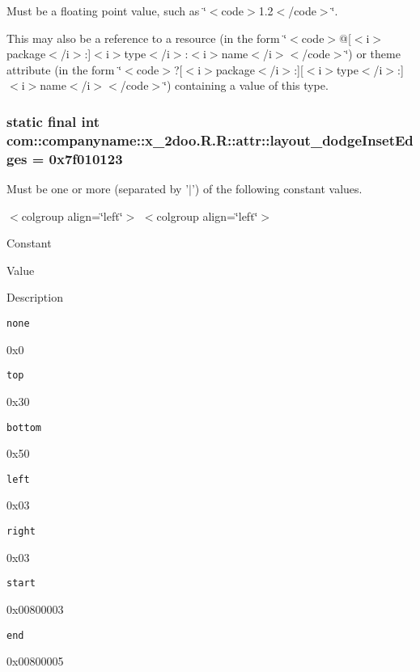 Must be a floating point value, such as \char`\"{}$<$code$>$1.2$<$/code$>$\char`\"{}. 

This may also be a reference to a resource (in the form \char`\"{}$<$code$>$@\mbox{[}$<$i$>$package$<$/i$>$:\mbox{]}$<$i$>$type$<$/i$>$:$<$i$>$name$<$/i$>$$<$/code$>$\char`\"{}) or theme attribute (in the form \char`\"{}$<$code$>$?\mbox{[}$<$i$>$package$<$/i$>$:\mbox{]}\mbox{[}$<$i$>$type$<$/i$>$:\mbox{]}$<$i$>$name$<$/i$>$$<$/code$>$\char`\"{}) containing a value of this type. \hypertarget{classcom_1_1companyname_1_1x__2doo_1_1_r_1_1attr_c809d052548073a02e91694193e09469}{
\subsubsection[{layout\_\-dodgeInsetEdges}]{\setlength{\rightskip}{0pt plus 5cm}static final int com::companyname::x\_\-2doo.R.R::attr::layout\_\-dodgeInsetEdges = 0x7f010123}}
\label{classcom_1_1companyname_1_1x__2doo_1_1_r_1_1attr_c809d052548073a02e91694193e09469}


Must be one or more (separated by '$|$') of the following constant values. \begin{TabularC}{0}
\hline
\end{TabularC}
$<$colgroup align=\char`\"{}left\char`\"{}$>$ $<$colgroup align=\char`\"{}left\char`\"{}$>$ 

Constant

Value

Description 

{\tt none}

0x0

{\tt top}

0x30

{\tt bottom}

0x50

{\tt left}

0x03

{\tt right}

0x03

{\tt start}

0x00800003

{\tt end}

0x00800005

